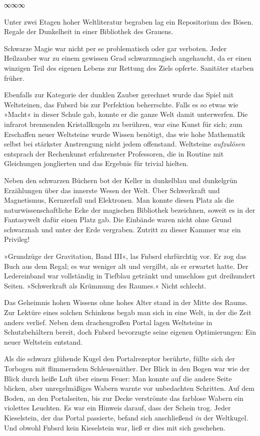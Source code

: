 \begin{center}
∞∞∞
\end{center}

Unter zwei Etagen hoher Weltliteratur begraben lag ein Repositorium des Bösen. Regale der Dunkelheit in einer Bibliothek des Grauens.

Schwarze Magie war nicht per se problematisch oder gar verboten. Jeder Heilzauber war zu einem gewissen Grad schwarzmagisch angehaucht, da er einen winzigen Teil des eigenen Lebens zur Rettung des Ziels opferte. Sanitäter starben früher.

Ebenfalls zur Kategorie der dunklen Zauber gerechnet wurde das Spiel mit Weltsteinen, das Fnbsrd bis zur Perfektion beherrschte. Falls es so etwas wie »Macht« in dieser Schule gab, konnte er die ganze Welt damit unterwerfen. Die infrarot brennenden Kristallkugeln zu berühren, war eine Kunst für sich; zum Erschaffen neuer Weltsteine wurde Wissen benötigt, das wie hohe Mathematik selbst bei stärkster Anstrengung nicht jedem offenstand. Weltsteine \emph{aufzulösen} entsprach der Rechenkunst erfahrenster Professoren, die in Routine mit Gleichungen jonglierten und das Ergebnis für trivial hielten.

Neben den schwarzen Büchern bot der Keller in dunkelblau und dunkelgrün Erzählungen über das innerste Wesen der Welt. Über Schwerkraft und Magnetismus, Kernzerfall und Elektronen. Man konnte diesen Platz als die naturwissenschaftliche Ecke der magischen Bibliothek bezeichnen, soweit es in der Fantasywelt dafür einen Platz gab. Die Einbände waren nicht ohne Grund schwarznah und unter der Erde vergraben. Zutritt zu dieser Kammer war ein Privileg!

»Grundzüge der Gravitation, Band III«, las Fnbsrd ehrfürchtig vor. Er zog das Buch aus dem Regal; es war weniger alt und vergilbt, als er erwartet hatte. Der Ledereinband war vollständig in Tiefblau getränkt und umschloss gut dreihundert Seiten. »Schwerkraft als Krümmung des Raumes.« Nicht schlecht.

Das Geheimnis hohen Wissens ohne hohes Alter stand in der Mitte des Raums. Zur Lektüre eines solchen Schinkens begab man sich in eine Welt, in der die Zeit anders verlief. Neben dem drachengroßen Portal lagen Weltsteine in Schutzbehältern bereit, doch Fnbsrd bevorzugte seine eigenen Optimierungen: Ein neuer Weltstein entstand.

Als die schwarz glühende Kugel den Portalrezeptor berührte, füllte sich der Torbogen mit flimmerndem Schleusenäther. Der Blick in den Bogen war wie der Blick durch heiße Luft über einem Feuer: Man konnte auf die andere Seite blicken, aber unregelmäßiges Wabern warnte vor unbedachten Schritten. Auf dem Boden, an den Portalseiten, bis zur Decke verströmte das farblose Wabern ein violettes Leuchten. Es war ein Hinweis darauf, dass der Schein trog. Jeder Kieselstein, der das Portal passierte, befand sich anschließend \emph{in} der Weltkugel. Und obwohl Fnbsrd kein Kieselstein war, ließ er dies mit sich geschehen.


